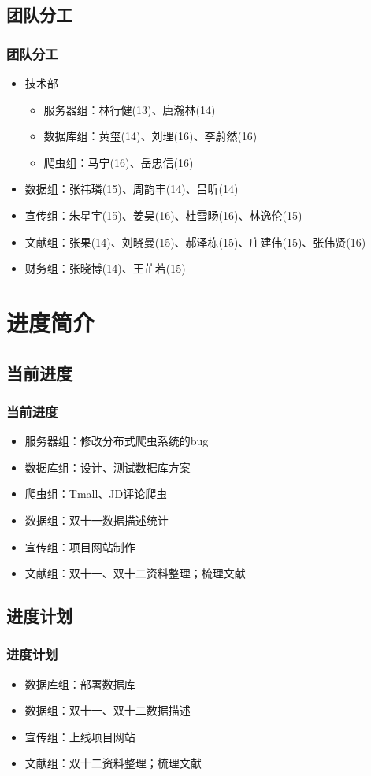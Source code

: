 \documentclass{beamer}
\begin{document}
\subsection{团队分工}
\begin{frame}
\frametitle{团队分工}
\begin{itemize}
  \item 技术部
  \begin{itemize}
    \item 服务器组：林行健(13)、唐瀚林(14)
    \item 数据库组：黄玺(14)、刘理(16)、李蔚然(16)
    \item 爬虫组：马宁(16)、岳忠信(16)
  \end{itemize}
  \item 数据组：张祎璘(15)、周韵丰(14)、吕昕(14)
  \item 宣传组：朱星宇(15)、姜昊(16)、杜雪旸(16)、林逸伦(15)
  \item 文献组：张果(14)、刘晓曼(15)、郝泽栋(15)、庄建伟(15)、张伟贤(16)
  \item 财务组：张晓博(14)、王芷若(15)
\end{itemize}

\end{frame}
\section{进度简介}
\subsection{当前进度}
\begin{frame}
\frametitle{当前进度}
\begin{itemize}
  \item 服务器组：修改分布式爬虫系统的bug
  \item 数据库组：设计、测试数据库方案
  \item 爬虫组：Tmall、JD评论爬虫
  \item 数据组：双十一数据描述统计
  \item 宣传组：项目网站制作
  \item 文献组：双十一、双十二资料整理；梳理文献
\end{itemize}
\end{frame}

\subsection{进度计划}
\begin{frame}
\frametitle{进度计划}
\begin{itemize}
  \item 数据库组：部署数据库
  \item 数据组：双十一、双十二数据描述
  \item 宣传组：上线项目网站
  \item 文献组：双十二资料整理；梳理文献
\end{itemize}
\end{frame}
\end{document}
